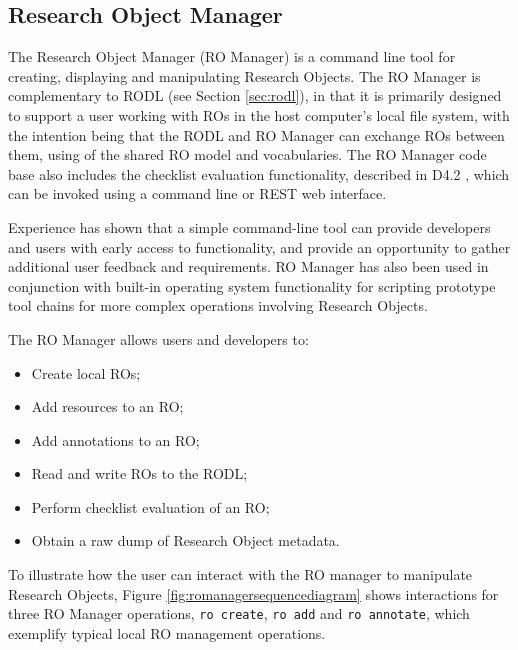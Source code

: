 \subsection{Research Object Manager}
\label{sec:romanager}


The Research Object Manager (RO Manager) is a command line tool for creating, displaying and manipulating Research Objects. The RO Manager is complementary to RODL (see Section \ref{sec:rodl}), in that it is primarily designed to support a user working with ROs in the host computer's local file system, with the intention being that the RODL and RO Manager can exchange ROs between them, using of the shared RO model and vocabularies.  The RO Manager code base also includes the checklist evaluation functionality, described in D4.2 \cite{D4.2v2}, which can be invoked using a command line or REST web interface.

Experience has shown that a simple command-line tool can provide developers and users with early access to functionality, and provide an opportunity to gather additional user feedback and requirements.  RO Manager has also been used in conjunction with built-in operating system functionality for scripting prototype tool chains for more complex operations involving Research Objects.

The RO Manager allows users and developers to:

\begin{itemize}

\item Create local ROs;
\item Add resources to an RO;
\item Add annotations to an RO;
\item Read and write ROs to the RODL;
\item Perform checklist evaluation of an RO;
\item Obtain a raw dump of Research Object metadata.
\end{itemize}

To illustrate how the user can interact with the RO manager to manipulate Research Objects, Figure \ref{fig:romanagersequencediagram} shows interactions for three RO Manager operations, \texttt{ro create}, \texttt{ro add} and
\texttt{ro annotate}, which exemplify typical local RO management operations.


